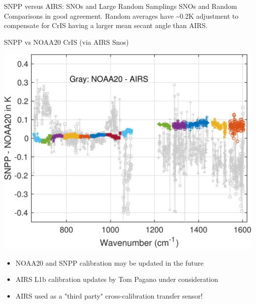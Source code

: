 \documentclass[10pt,t]{beamer}
\begin{document}
\begin{frame}[label={sec:org65d5bd9}]{SNPP versus AIRS: SNOs and Large Random Samplings}
\small
SNOs and Random Comparisons in good agreement.  Random averages have \textasciitilde{}0.2K adjustment to compensate for CrIS having a larger mean secant angle than AIRS.
\end{frame}

\begin{frame}[label={sec:org8067b9c}]{SNPP vs NOAA20 CrIS (via AIRS Snos)}
\vspace{-0.1in}

\begin{center}
\includegraphics[width=0.65\linewidth]{./Figs/Pdf/sno_march2018_snpp_minus_noaa20_with_c2_airs_ingrey.pdf}
\end{center}

\vspace{-0.1in}

\small
\begin{itemize}
\item NOAA20 and SNPP calibration may be updated in the future
\item AIRS L1b calibration updates by Tom Pagano under consideration
\item AIRS used as a "third party" cross-calibration transfer sensor!
\end{itemize}
\end{frame}
\end{document}
